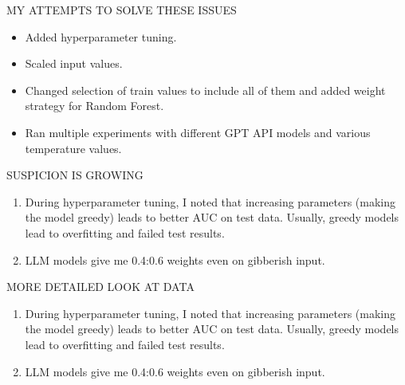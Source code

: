 \documentclass[11pt, aspectratio=169]{beamer}
\begin{document}
\begin{frame}{\MakeUppercase{My attempts to solve these issues}}

    \begin{itemize}
        \item Added hyperparameter tuning.
        \item Scaled input values.
        \item Changed selection of train values to include all of them and added weight strategy for Random Forest.
        \item Ran multiple experiments with different GPT API models and various temperature values.
    \end{itemize}

\end{frame}

\begin{frame}{\MakeUppercase{Suspicion is growing}}

    \begin{enumerate}
        \item During hyperparameter tuning, I noted that increasing parameters (making the model greedy) leads to better AUC on test data. Usually, greedy models lead to overfitting and failed test results.
        \item LLM models give me 0.4:0.6 weights even on gibberish input.
    \end{enumerate}

\end{frame}


\begin{frame}{\MakeUppercase{More detailed look at data}}

    \begin{enumerate}
        \item During hyperparameter tuning, I noted that increasing parameters (making the model greedy) leads to better AUC on test data. Usually, greedy models lead to overfitting and failed test results.
        \item LLM models give me 0.4:0.6 weights even on gibberish input.
    \end{enumerate}

\end{frame}
\end{document}
